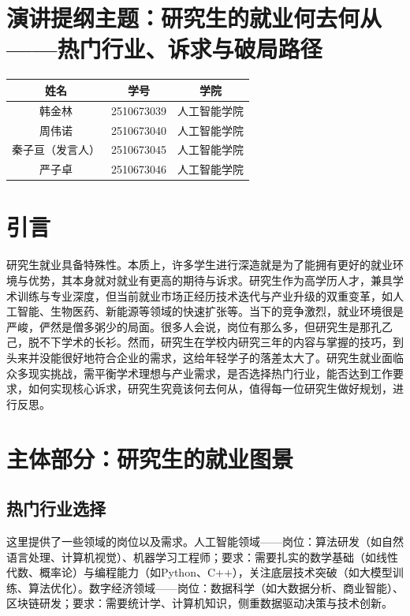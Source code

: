 \documentclass[12pt,a4paper]{ctexart}
\begin{document}
\section*{演讲提纲主题：研究生的就业何去何从——热门行业、诉求与破局路径}

\vspace{0.5em}
\begin{center}
\begin{tabular}{ccc}
\toprule
姓名 & 学号 & 学院 \\
\midrule
韩金林 & 2510673039 & 人工智能学院 \\
周伟诺 & 2510673040 & 人工智能学院 \\
秦子亘（发言人） & 2510673045 & 人工智能学院 \\
严子卓 & 2510673046 & 人工智能学院 \\
\bottomrule
\end{tabular}
\end{center}
\vspace{0.5em}

\section{引言}


研究生就业具备特殊性。本质上，许多学生进行深造就是为了能拥有更好的就业环境与优势，其本身就对就业有更高的期待与诉求。研究生作为高学历人才，兼具学术训练与专业深度，但当前就业市场正经历技术迭代与产业升级的双重变革，如人工智能、生物医药、新能源等领域的快速扩张等。当下的竞争激烈，就业环境很是严峻，俨然是僧多粥少的局面。很多人会说，岗位有那么多，但研究生是那孔乙己，脱不下学术的长衫。然而，研究生在学校内研究三年的内容与掌握的技巧，到头来并没能很好地符合企业的需求，这给年轻学子的落差太大了。研究生就业面临众多现实挑战，需平衡学术理想与产业需求，是否选择热门行业，能否达到工作要求，如何实现核心诉求，研究生究竟该何去何从，值得每一位研究生做好规划，进行反思。


\section{主体部分：研究生的就业图景}

\subsection{热门行业选择}

这里提供了一些领域的岗位以及需求。人工智能领域——岗位：算法研发（如自然语言处理、计算机视觉）、机器学习工程师；要求：需要扎实的数学基础（如线性代数、概率论）与编程能力（如Python、C++），关注底层技术突破（如大模型训练、算法优化）。数字经济领域——岗位：数据科学（如大数据分析、商业智能）、区块链研发；要求：需要统计学、计算机知识，侧重数据驱动决策与技术创新。
\end{document}
